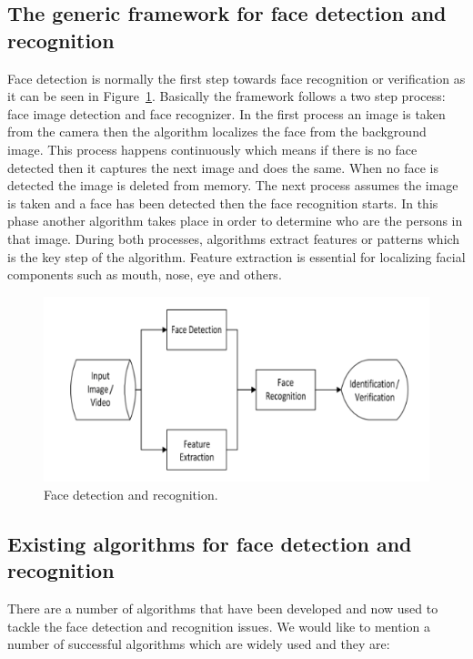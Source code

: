 \subsection{The generic framework for face detection and recognition}


Face detection is normally the first step towards face recognition or verification as it can be seen in  Figure~\ref{fig:framework}. Basically the framework follows a two step process: face image detection and face recognizer. In the first process an image is taken from the camera then the algorithm localizes the face from the background image. This process happens continuously which means if there is no face detected then it captures the next image and does the same. When no face is detected the image is deleted from memory. The next process assumes the image is taken and a face has been detected then the face recognition starts. In this phase another algorithm takes place in order to determine who are the persons in that image. During both processes, algorithms extract features or patterns which is the key step of the algorithm. Feature extraction is essential for localizing facial components such as mouth, nose, eye and others. 

\begin{figure}[!htb]
    \centering
    \includegraphics[width=1\textwidth]{figures/framework.jpg}
    \caption{ Face detection and recognition.}
    \label{fig:framework}
\end{figure}


\subsection{Existing  algorithms  for  face detection and recognition}

There are a number of algorithms that have been developed and now used to tackle the face detection and recognition issues. We would like to mention a number of successful algorithms which are widely used and they are: 


